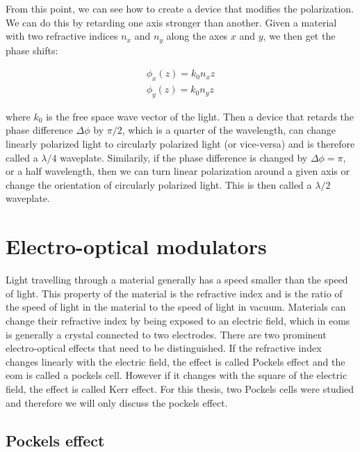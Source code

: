 From this point, we can see how to create a device that modifies the polarization. We can do this by retarding one axis stronger than another. Given a material with two refractive indices $n_x$ and $n_y$ along the axes $x$ and $y$, we then get the phase shifts:

\begin{align}
	\phi_x(z) = k_0 n_x z \\
	\phi_y(z) = k_0 n_y z
\end{align}
\label{eq:pol,phases}

where $k_0$ is the free space wave vector of the light. Then a device that retards the phase difference $\Delta \phi$ by $\pi/2$, which is a quarter of the wavelength, can change linearly polarized light to circularly polarized light (or vice-versa) and is therefore called a $\lambda / 4$ waveplate. Similarily, if the phase difference is changed by $\Delta \phi = \pi$, or a half wavelength, then we can turn linear polarization around a given axis or change the orientation of circularly polarized light. This is then called a $\lambda / 2$ waveplate.

\section{Electro-optical modulators}
\label{sec:eom}

Light travelling through a material generally has a speed smaller than the speed of light. This property of the material is the refractive index and is the ratio of the speed of light in the material to the speed of light in vacuum. Materials can change their refractive index by being exposed to an electric field, which in \acp{eom} is generally a crystal connected to two electrodes. There are two prominent electro-optical effects that need to be distinguished. If the refractive index changes linearly with the electric field, the effect is called Pockels effect and the \ac{eom} is called a pockels cell. However if it changes with the square of the electric field, the effect is called Kerr effect. For this thesis, two Pockels cells were studied and therefore we will only discuss the pockels effect.


\subsection{Pockels effect}
\label{sec:pockels_effect}

